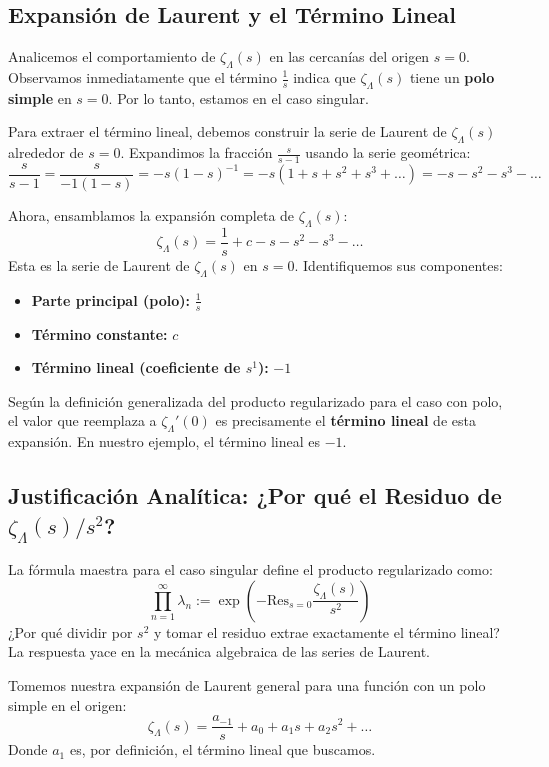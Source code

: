 \subsection{Expansión de Laurent y el Término Lineal}

Analicemos el comportamiento de $\zeta_\Lambda(s)$ en las cercanías del origen $s=0$. Observamos inmediatamente que el término $\frac{1}{s}$ indica que $\zeta_\Lambda(s)$ tiene un \textbf{polo simple} en $s=0$. Por lo tanto, estamos en el caso singular.

Para extraer el término lineal, debemos construir la serie de Laurent de $\zeta_\Lambda(s)$ alrededor de $s=0$. Expandimos la fracción $\frac{s}{s-1}$ usando la serie geométrica:
$$ \frac{s}{s-1} = \frac{s}{-1(1 - s)} = -s (1 - s)^{-1} = -s (1 + s + s^2 + s^3 + \dots) = -s - s^2 - s^3 - \dots $$

Ahora, ensamblamos la expansión completa de $\zeta_\Lambda(s)$:
$$ \zeta_\Lambda(s) = \frac{1}{s} + c - s - s^2 - s^3 - \dots $$
Esta es la serie de Laurent de $\zeta_\Lambda(s)$ en $s=0$. Identifiquemos sus componentes:
\begin{itemize}
    \item \textbf{Parte principal (polo):} $\frac{1}{s}$
    \item \textbf{Término constante:} $c$
    \item \textbf{Término lineal (coeficiente de $s^1$):} $-1$
\end{itemize}

Según la definición generalizada del producto regularizado para el caso con polo, el valor que reemplaza a $\zeta_\Lambda'(0)$ es precisamente el \textbf{término lineal} de esta expansión. En nuestro ejemplo, el término lineal es $-1$.

\subsection{Justificación Analítica: ¿Por qué el Residuo de $\zeta_\Lambda(s)/s^2$?}

La fórmula maestra para el caso singular define el producto regularizado como:
$$ \prod_{n=1}^\infty \lambda_n := \exp\left( - \text{Res}_{s=0} \frac{\zeta_\Lambda(s)}{s^2} \right) $$
¿Por qué dividir por $s^2$ y tomar el residuo extrae exactamente el término lineal? La respuesta yace en la mecánica algebraica de las series de Laurent.

Tomemos nuestra expansión de Laurent general para una función con un polo simple en el origen:
$$ \zeta_\Lambda(s) = \frac{a_{-1}}{s} + a_0 + a_1 s + a_2 s^2 + \dots $$
Donde $a_1$ es, por definición, el término lineal que buscamos.

